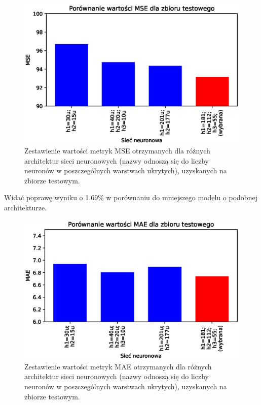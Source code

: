 \documentclass[a4paper,11pt]{article}
\begin{document}
    \bigskip

    \begin{figure}[H]
        \label{fig:compr_mse}
        \centering
        \includegraphics[width=\textwidth]{compr_mse}
        \caption{Zestawienie wartości metryk MSE otrzymanych dla różnych architektur sieci neuronowych (nazwy odnoszą się do liczby neuronów w poszczególnych warstwach ukrytych), uzyskanych na zbiorze testowym.}
    \end{figure}

    Widać poprawę wyniku o 1.69\% w porównaniu do mniejszego modelu o podobnej architekturze.

    \bigskip

    \begin{figure}[H]
        \label{fig:compr_mae}
        \centering
        \includegraphics[width=\textwidth]{compr_mae}
        \caption{Zestawienie wartości metryk MAE otrzymanych dla różnych architektur sieci neuronowych (nazwy odnoszą się do liczby neuronów w poszczególnych warstwach ukrytych), uzyskanych na zbiorze testowym.}
    \end{figure}
\end{document}
